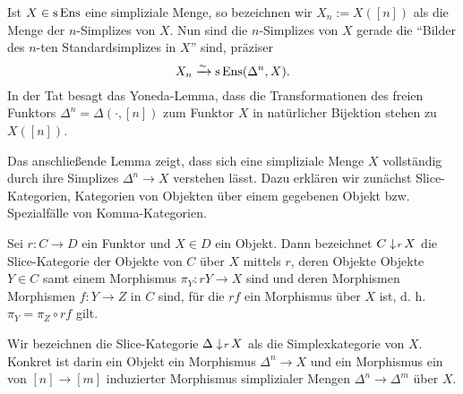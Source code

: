 Ist $X \in \operatorname{s}\operatorname{Ens}$ eine simpliziale Menge, so bezeichnen wir $X_n :=
X([n])$ als die Menge der $n$-Simplizes von $X$. Nun sind die
$n$-Simplizes von $X$ gerade die ``Bilder des $n$-ten
Standardsimplizes in $X$'' sind, präziser
\begin{equation} \label{eq:simp-as-hom}
X_n \xrightarrow[]{\sim} \operatorname{s}\operatorname{Ens}(\Delta^n, X).
\end{equation}
In der Tat besagt das Yoneda-Lemma, dass die Transformationen des
freien Funktors $\Delta^n = \Delta(\cdot, [n])$ zum Funktor $X$ in
natürlicher Bijektion stehen zu $X([n])$.

Das anschließende Lemma zeigt, dass sich eine simpliziale Menge $X$
vollständig durch ihre Simplizes $\Delta^n \to X$ verstehen
lässt. Dazu erklären wir zunächst Slice-Kategorien, Kategorien von
Objekten über einem gegebenen Objekt bzw. Spezialfälle von
Komma-Kategorien.
\begin{defn}
  Sei $r: C \to D$ ein Funktor und $X \in D$ ein Objekt. Dann
  bezeichnet $C \downarrow \! {\scriptstyle r} \, X$ die Slice-Kategorie der Objekte von
  $C$ über $X$ mittels $r$, deren Objekte Objekte $Y \in C$ samt einem
  Morphismus $\pi_Y: rY \to X$ sind und deren Morphismen Morphismen
  $f: Y \to Z$ in $C$ sind, für die $rf$ ein Morphismus über $X$ ist,
  d. h. $\pi_Y = \pi_Z \circ rf$ gilt.
\end{defn}
Wir bezeichnen die Slice-Kategorie $\Delta \downarrow \! {\scriptstyle r} \, X$ als die
Simplexkategorie von $X$. Konkret ist darin ein Objekt ein Morphismus
$\Delta^n \to X$ und ein Morphismus ein von $[n] \to [m]$ induzierter
Morphismus simplizialer Mengen $\Delta^n \to \Delta^m$ über $X$.

